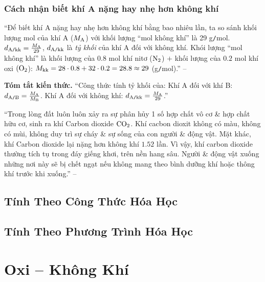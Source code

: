 \documentclass{article}
\numberwithin{equation}{section}
\begin{document}
\subsubsection{Cách nhận biết khí A nặng hay nhẹ hơn không khí}
``Để biết khí A nặng hay nhẹ hơn không khí bằng bao nhiêu lần, ta so sánh khối lượng mol của khí A ($M_{\rm A}$) với khối lượng ``mol không khí'' là 29 g\texttt{/}mol. $d_{\rm A\texttt{/}kk} = \frac{M_{\rm A}}{29}$, $d_{\rm A\texttt{/}kk}$ là \textit{tỷ khối} của khí A đối với không khí. Khói lượng ``mol không khí'' là khối lượng của $0.8$ mol khí nitơ ($\rm N_2$) $+$ khối lượng của $0.2$ mol khí oxi $(\rm O_2$): $M_{\rm kk} = 28\cdot 0.8 + 32\cdot 0.2 = 28.8\approx 29$ (g\texttt{/}mol).'' -- \cite[p. 68]{SGK_Hoa_Hoc_8}
\vspace{2mm}

\noindent\textbf{Tóm tắt kiến thức.} ``Công thức tính tỷ khối của: Khí A đối với khí B: $d_{\rm A\texttt{/}B} = \frac{M_{\rm A}}{M_{\rm B}}$. Khí A đối với không khí: $d_{\rm A\texttt{/}kk} = \frac{M_{\rm A}}{29}$.''

``Trong lòng đất luôn luôn xảy ra sự phân hủy 1 số hợp chất vô cơ \& hợp chất hữu cơ, sinh ra khí Carbon dioxide $\rm CO_2$. Khí cacbon dioxit không có màu, không có mùi, không duy trì sự cháy \& sự sống của con người \& động vật. Mặt khác, khí Carbon dioxide lại nặng hơn không khí $1.52$ lần. Vì vậy, khí carbon dioxide thường tích tụ trong đáy giếng khơi, trên nền hang sâu. Người \& động vật xuống những nơi này sẽ bị chết ngạt nếu không mang theo bình dưỡng khí hoặc thông khí trước khi xuống.'' -- \cite[p. 69]{SGK_Hoa_Hoc_8}


\subsection{Tính Theo Công Thức Hóa Học}


\subsection{Tính Theo Phương Trình Hóa Học}


\section{Oxi -- Không Khí}
\end{document}
